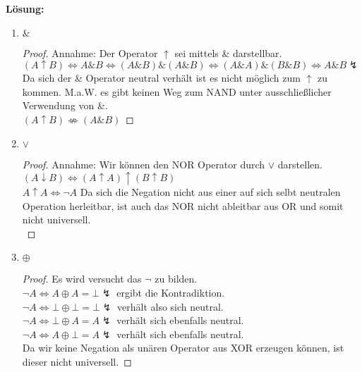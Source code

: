 \documentclass[paper=a4,fontsize=11pt]{scrartcl}%
\numberwithin{equation}{section}
\newenvironment{solution}
	{
		\color{Blue}
		\textbf{Lösung:}
	}{}
\begin{document}
\begin{enumerate}
	\begin{solution}
	
	\begin{enumerate}
\item $\&$
\begin{proof}
Annahme: Der Operator $\uparrow$ sei mittels \& darstellbar.\\
$(A \uparrow B) \Leftrightarrow A \& B \Leftrightarrow (A \& B) \& (A \& B) \Leftrightarrow (A \& A) \& (B \& B) \Leftrightarrow A \& B \lightning$ \\ 
Da sich der \& Operator neutral verhält ist es nicht möglich zum $\uparrow$ zu kommen. M.a.W. es gibt keinen Weg zum NAND unter ausschließlicher Verwendung von \&.\\
$(A \uparrow B) \nLeftrightarrow (A \& B)$ 
\end{proof}
\item $\lor$
\begin{proof}
Annahme: Wir können den NOR Operator durch $\lor$ darstellen.\\
$(A \downarrow B) \Leftrightarrow (A \uparrow A) \uparrow (B \uparrow B)$\\
$A \uparrow A \Leftrightarrow \neg A$ Da sich die Negation nicht aus einer auf sich selbt neutralen Operation herleitbar, ist auch das NOR nicht ableitbar aus OR und somit nicht universell.\\
\end{proof}
\item $\oplus$ 
\begin{proof}
Es wird versucht das $\neg$ zu bilden.\\
$\neg A \Leftrightarrow A \oplus A = \bot \lightning$ ergibt die Kontradiktion.\\
$\neg A \Leftrightarrow \bot \oplus \bot = \bot \lightning$ verhält also sich neutral.\\
$\neg A \Leftrightarrow \bot \oplus A = A \lightning $ verhält sich ebenfalls neutral.\\
$\neg A \Leftrightarrow A \oplus \bot = A \lightning $ verhält sich ebenfalls neutral.\\
Da wir keine Negation als unären Operator aus XOR erzeugen können, ist dieser nicht universell.
\end{proof}
\end{enumerate}
	\end{solution}
\end{enumerate}
	
\end{document}
